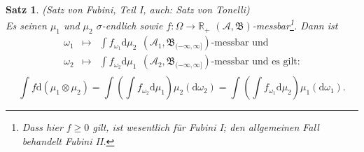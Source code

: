 \documentclass[a4paper,11pt]{book}
\newcommand{\R}{{\mathbb R}}
\def\AA{ \mathcal{A} }
\def\BB{ \mathfrak{B} }
\def\d{\mbox{d}}
\newtheorem{Sa}{Satz}[chapter]
\theoremstyle{nonumberplain}
\begin{document}
\begin{Sa} (Satz von Fubini, Teil I, auch: Satz von Tonelli) \\
Es seinen $\mu_1$ und $\mu_2$ $\sigma$-endlich sowie $f:\Omega\to\R_+$ $(\AA,\BB)$-messbar\footnote{Dass hier $f\ge 0$ gilt, ist wesentlich für Fubini I; den allgemeinen Fall behandelt Fubini II.}. Dann ist
\begin{eqnarray*}
\omega_1 & \mapsto & \int f_{\omega_1}\d\mu_2 \ \ (\AA_1,\BB_{(-\infty,\infty]})\text{-messbar und} \\
\omega_2 & \mapsto & \int f_{\omega_2}\d\mu_1 \ \ (\AA_2,\BB_{(-\infty,\infty]})\text{-messbar und es gilt:} \\
\end{eqnarray*}
\begin{displaymath}
\int f\d\left(\mu_1\otimes\mu_2\right) = \int\left(\int f_{\omega_2}\d\mu_1\right)\mu_2\left(\d\omega_2\right) = \int\left(\int f_{\omega_1}\d\mu_2\right)\mu_1\left(\d\omega_1\right).
\end{displaymath}
\end{Sa}
\end{document}
